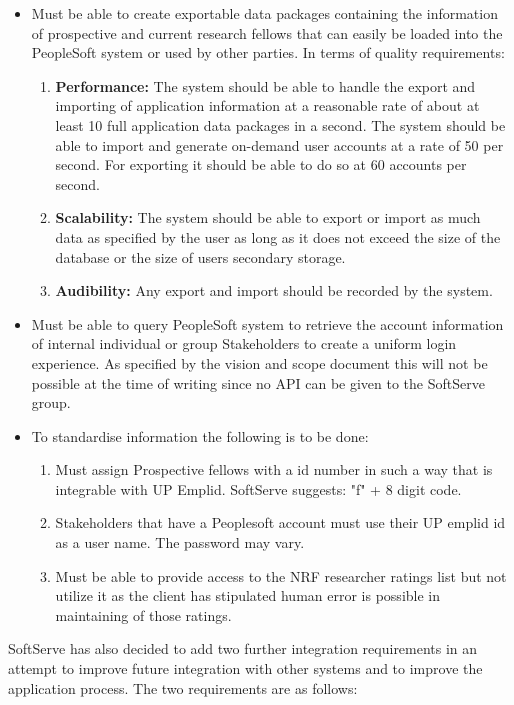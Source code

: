 \documentclass[12pt]{article}
\begin{document}
\begin{itemize}
	\item Must be able to create exportable data packages containing the information of prospective and current research fellows that can easily be loaded into the PeopleSoft system or used by other parties. In terms of quality requirements:
	\begin{enumerate}
		\item \textbf{Performance:} The system should be able to handle the export and importing of application information at a reasonable rate of about at least 10 full application data packages in a second. The system should be able to import and generate on-demand user accounts at a rate of 50 per second. For exporting it should be able to do so at 60 accounts per second.
		\item \textbf{Scalability:} The system should be able to export or import as much data as specified by the user as long as it does not exceed the size of the database or the size of users secondary storage. 
		\item \textbf{Audibility:} Any export and import should be recorded by the system.
	\end{enumerate}  
	\item Must be able to query PeopleSoft system to retrieve the account information of internal individual or group Stakeholders to create a uniform login experience. As specified by the vision and scope document this will not be possible at the time of writing since no API can be given to the SoftServe group. 
	\item To standardise information the following is to be done:
	\begin{enumerate}  
		\item Must assign Prospective fellows with a id number in such a way that is integrable with UP Emplid. SoftServe suggests: "f" + 8 digit code.
		\item Stakeholders that have a Peoplesoft account must use their UP emplid id as a user name. The password may vary.
		\item Must be able to provide access to the NRF researcher ratings list but not utilize it as the client has stipulated human error is possible in maintaining of those ratings.
	\end{enumerate}
\end{itemize}

SoftServe has also decided to add two further integration requirements in an attempt to improve future integration with other systems and to improve the application process. The two requirements are as follows:
\end{document}
